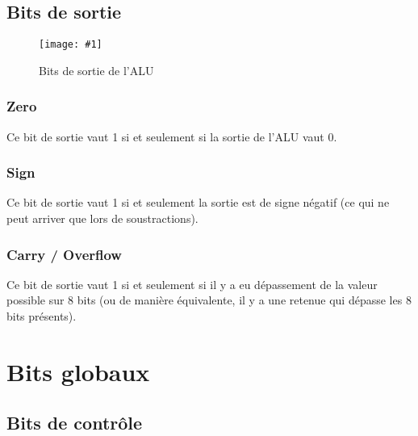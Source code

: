 \documentclass[twoside, 12pt, a4paper]{article}
\newcommand{\cf}[3]{
    \begin{figure}[!h]
        \centering
        \texttt{[image: \#1]}
    \caption{#3}\label{Fig:#1}
    \end{figure}
}
\newcommand{\hcf}[2]{\cf{#1}{.75}{#2}}
\begin{document}
    \subsection{Bits de sortie}

    \hcf{out_ALU.png}{Bits de sortie de l'ALU}
    
        \subsubsection{Zero}
        Ce bit de sortie vaut 1 si et seulement si la sortie de l'ALU vaut 0.

        \subsubsection{Sign}
        Ce bit de sortie vaut 1 si et seulement la sortie est de signe négatif (ce qui ne peut arriver que lors de soustractions).

        \subsubsection{Carry / Overflow}
        Ce bit de sortie vaut 1 si et seulement si il y a eu dépassement de la valeur possible sur 8 bits (ou de manière équivalente, il y a une retenue qui dépasse les 8 bits présents).
        
\clearpage
    
\section{Bits globaux}

\subsection{Bits de contrôle}
\end{document}
